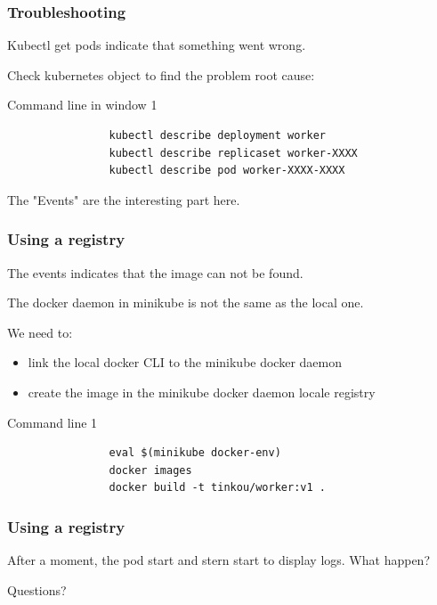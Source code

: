 	\begin{frame}[fragile]
		\frametitle{Troubleshooting}
		
		Kubectl get pods indicate that something went wrong.
		
		Check kubernetes object to find the problem root cause:
		\begin{block}{Command line in window 1}
			\begin{verbatim}
				kubectl	describe deployment worker
				kubectl describe replicaset worker-XXXX
				kubectl describe pod worker-XXXX-XXXX
			\end{verbatim}
		\end{block}
		
		The "Events" are the interesting part here.
		
	\end{frame}
	
	\begin{frame}[fragile]
		\frametitle{Using a registry}
		
		The events indicates that the image can not be found.
		
		\medskip
		
		The docker daemon in minikube is not the same as the local one.
		
		\medskip 
		We need to:
		\begin{itemize}
			\item link the local docker CLI to the minikube docker daemon
			\item create the image in the minikube docker daemon locale registry
		\end{itemize}
		
		\begin{block}{Command line 1}
			\begin{verbatim}
				eval $(minikube docker-env)
				docker images
				docker build -t tinkou/worker:v1 .
			\end{verbatim}
		\end{block}

	\end{frame}
	
	\begin{frame}[fragile]
		\frametitle{Using a registry}
	
		After a moment, the pod start and stern start to display logs. What happen?
		
		\bigskip
		
	
	\end{frame}


	\begin{frame}
		\begin{center}
			Questions?
		\end{center}
	\end{frame}